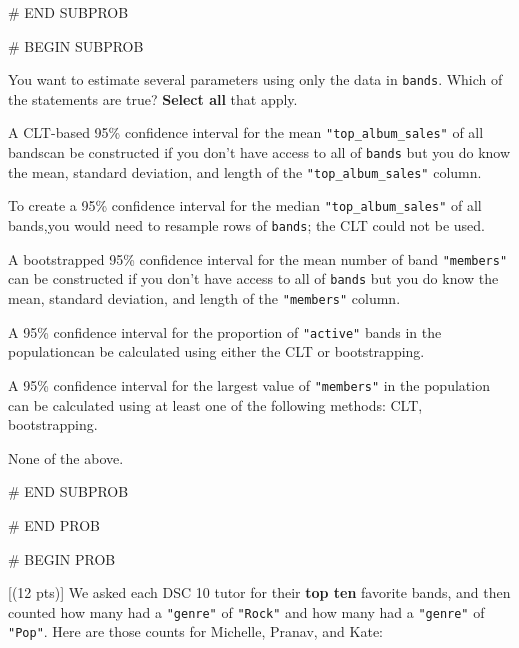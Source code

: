 \documentclass[twoside,12pt]{article}
\begin{document}
{\begin{center}
\end{center}



# END SUBPROB

\newpage

# BEGIN SUBPROB

 You want to estimate several parameters using only the data in \texttt{bands}. Which of the statements are true? \textbf{Select all} that apply.

\smallskip
[ ] A CLT-based 95\% confidence interval for the mean \texttt{"top\_album\_sales"} of all bands\gap can be constructed if you don't have access to all of \texttt{bands} but you do know the \gap mean, standard deviation, and length of the \texttt{"top\_album\_sales"} column.

\smallskip
[ ] To create a 95\% confidence interval for the median \texttt{"top\_album\_sales"} of all bands,\gap you would need to resample rows of \texttt{bands}; the CLT could not be used.

\smallskip
[ ] A bootstrapped 95\% confidence interval for the mean number of band \texttt{"members"} \gap can be constructed if you don't have access to all of \texttt{bands} but you do know the \gap mean, standard deviation, and length of the \texttt{"members"} column.

\smallskip
[ ] A 95\% confidence interval for the proportion of \texttt{"active"} bands in the population\gap can be calculated using either the CLT or bootstrapping.

\smallskip
[ ] A 95\% confidence interval for the largest value of \texttt{"members"} in the population can \gap be calculated using at least one of the following methods: CLT, bootstrapping.

\smallskip
[ ] None of the above.



# END SUBPROB





# END PROB





\newpage

# BEGIN PROB

[(12 pts)]
We asked each DSC 10 tutor for their \textbf{top ten} favorite bands, and then counted how many had a \texttt{"genre"} of \texttt{"Rock"} and how many had a \texttt{"genre"} of \texttt{"Pop"}. Here are those counts for Michelle, Pranav, and Kate:

}
\end{document}
